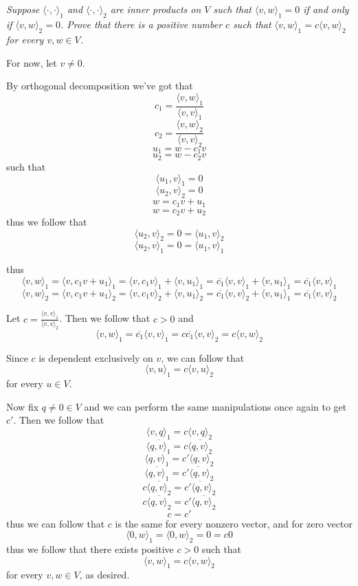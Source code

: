 \documentclass[11pt,oneside,titlepage]{book}
\newcommand{\eangle}[1]{\langle #1 \rangle}
\begin{document}
\subsection{}

\textit{Suppose $\eangle{\cdot,  \cdot}_1$ and $\eangle{\cdot,  \cdot}_2$  are inner products on $V$
  such that $\eangle{v, w}_1 = 0$ if and only if $\eangle{v, w}_2 = 0$.
  Prove that there is a positive number $c$ such that $\eangle{v, w}_1 = c \eangle{v, w}_2$
  for every $v, w \in V$.}

For now, let $v \neq 0$.

By orthogonal decomposition we've got that 
$$c_1 = \frac{\eangle{v, w}_1}{\eangle{v, v}_1}$$
$$c_2 = \frac{\eangle{v, w}_2}{\eangle{v, v}_2}$$
$$u_1 = w - c_1v$$
$$u_2 = w - c_2v$$
such that
$$\eangle{u_1, v}_1 = 0$$
$$\eangle{u_2, v}_2 = 0$$
$$w = c_1 v + u_1$$
$$w = c_2 v + u_2$$
thus we follow that
$$\eangle{u_2, v}_2 = 0 = \eangle{u_1, v}_2$$
$$\eangle{u_2, v}_1 = 0 = \eangle{u_1, v}_1$$


thus
$$\eangle{v, w}_1 = \eangle{v, c_1 v + u_1}_1 = \eangle{v, c_1 v}_1 + \eangle{v, u_1}_1 =
\overline{c_1} \eangle{v, v}_1 + \eangle{v, u_1}_1 = \overline{c_1} \eangle{v, v}_1$$
$$\eangle{v, w}_2 = \eangle{v, c_1 v + u_1}_2 = \eangle{v, c_1 v}_2 + \eangle{v, u_1}_2 =
\overline{c_1} \eangle{v, v}_2 + \eangle{v, u_1}_1 = \overline{c_1} \eangle{v, v}_2$$

Let $c = \frac{\eangle{v, v}_1}{ \eangle{v, v}_2}$. Then we follow that $c > 0$ and
$$\eangle{v, w}_1 = \overline{c_1} \eangle{v, v}_1 = c \overline{c_1} \eangle{v, v}_2 =
c \eangle{v, w}_2$$

Since $c$ is dependent exclusively on $v$, we can follow that
$$\eangle{v, u}_1 = c\eangle{v, u}_2$$
for every $u \in V$.

Now fix $q \neq 0 \in V$ and we can perform the same manipulations once again to get $c'$. Then we
follow that
$$\eangle{v, q}_1 = c \eangle{v, q}_2$$
$$\overline{\eangle{q, v}_1} = c \overline{ \eangle{q, v}_2}$$
$$\eangle{q, v}_1 = c' \eangle{q, v}_2 $$
$$\overline{\eangle{q, v}_1} = \overline{c' \eangle{q, v}_2} $$
$$c \overline{ \eangle{q, v}_2} = \overline{c' \eangle{q, v}_2}$$
$$c \overline{ \eangle{q, v}_2} = c' \overline{\eangle{q, v}_2}$$
$$c = c'$$
thus we can follow that $c$ is the same for every nonzero vector, and for zero vector
$$\eangle{0, w}_1 = \eangle{0, w}_2 =  0 = c0$$
thus we follow that there exists positive $c > 0$ such that
$$\eangle{v, w}_1 = c\eangle{v, w}_2$$
for every $v, w \in V$, as desired.
\end{document}
